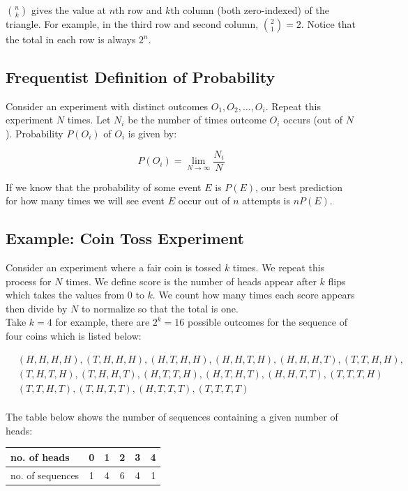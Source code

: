 $\binom{n}{k}$ gives the value at $n$th row and $k$th column (both zero-indexed) of the triangle. For example, in the third row and second column, $\binom{2}{1}=2$. Notice that the total in each row is always $2^n$.

\subsection{Frequentist Definition of Probability}

Consider an experiment with distinct outcomes $O_1, O_2, \dots, O_i$. Repeat this experiment $N$ times. Let $N_i$ be the number of times outcome $O_i$ occurs (out of $N$). Probability $P(O_i)$ of $O_i$ is given by:

$$P(O_i) = \lim_{N \to \infty} \frac{N_i}{N}$$

If we know that the probability of some event $E$ is $P(E)$, our best prediction for how many times we will see event $E$ occur out of $n$ attempts is $nP(E)$.

\subsection{Example: Coin Toss Experiment}

Consider an experiment where a fair coin is tossed $k$ times. We repeat this process for $N$ times. We define score is the number of heads appear after $k$ flips which takes the values from $0$ to $k$. We count how many times each score appears then divide by $N$ to normalize so that the total is one. \\

Take $k=4$ for example, there are $2^k=16$ possible outcomes for the sequence of four coins which is listed below:

\begin{equation*}
	\begin{split}
		&(H,H,H,H), (T,H,H,H), (H,T,H,H), (H,H,T,H), (H,H,H,T), (T,T,H,H), \\
		&(T,H,T,H), (T,H,H,T), (H,T,T,H), (H,T,H,T), (H,H,T,T), (T,T,T,H) \\
		&(T,T,H,T), (T,H,T,T), (H,T,T,T), (T,T,T,T)
	\end{split}
\end{equation*} \\

The table below shows the number of sequences containing a given number of heads: \\

\begin{tabular}{l*{4}{c}r}
	no. of heads & 0 & 1 & 2 & 3 & 4 \\
	\hline
	no. of sequences & 1 & 4 & 6 & 4 & 1
\end{tabular} \\

